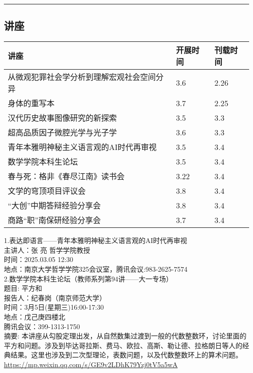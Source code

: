 \documentclass[letterpaper, 12pt]{article}
\begin{document}
\hrule
\pagebreak
\begin{multicols}{2}

\section{讲座}
\begin{tabular}{|>{\centering\arraybackslash}m{}|m{}|m{}|}
    \hline
    讲座 & 开展时间 & 刊载时间\\
    \hline\hline
    从微观犯罪社会学分析到理解宏观社会空间分异   &3.6  &2.26 \\\hline
    身体的重写本 & 3.7 & 2.25\\\hline
    汉代历史故事图像研究的新探索 & 3.5 & 3.3\\\hline
    超高品质因子微腔光学与光子学 & 3.6 & 3.3\\\hline
    青年本雅明神秘主义语言观的AI时代再审视 & 3.5 & 3.4\\\hline
    数学学院本科生论坛 & 3.5 & 3.4\\\hline
    春与死：格非《春尽江南》读书会 & 3.22 & 3.4\\\hline
    文学的穹顶项目评议会 & 3.8 & 3.4\\\hline
    “大创”中期答辩经验分享会 & 3.8 & 3.4\\\hline
    商路“职”南保研经验分享会 & 3.7 & 3.4\\\hline
\end{tabular}

1.表达即语言——青年本雅明神秘主义语言观的AI时代再审视\\
主讲人：张 亮 哲学学院教授\\
时间：2025.03.05 12:30\\
地点：南京大学哲学学院325会议室，腾讯会议:983-2625-7574\\

2.数学学院本科生论坛（教师系列第94讲——大一专场）\\
题目: 平方和\\
报告人：纪春岗（南京师范大学）\\
时间：3月5日(星期三)16:00-17:30\\
地点：戊己庚四楼北\\
腾讯会议：399-1313-1750\\
摘要:  本讲座从勾股定理出发，从自然数集过渡到一般的代数整数环，讨论里面的平方和问题。涉及到毕达哥拉斯、费马、欧拉、高斯、勒让德、拉格朗日等人的经典结果。这里也涉及到二次型理论，表数问题，以及代数整数环上的算术问题。\\
\url{https://mp.weixin.qq.com/s/GE9v2LDhK79Yzj0tV5a5wA}\\


\end{multicols}
\end{document}

